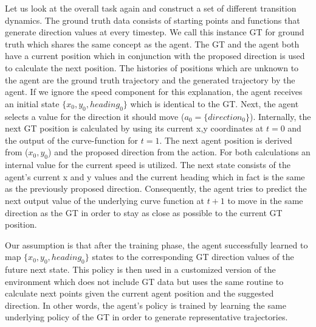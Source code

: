 Let us look at the overall task again and construct a set of different transition dynamics. The ground truth data consists of starting points and functions that generate direction values at every timestep. We call this instance GT for ground truth which shares the same concept as the agent. The GT and the agent both have a current position which in conjunction with the proposed direction is used to calculate the next position. The histories of positions which are unknown to the agent are the ground truth trajectory and the generated trajectory by the agent. If we ignore the speed component for this explanation, the agent receives an initial state $\{x_0,y_0,heading_0\}$ which is identical to the GT. Next, the agent selects a value for the direction it should move ($a_0=\{direction_0\}$). Internally, the next GT position is calculated by using its current x,y coordinates at $t=0$ and the output of the curve-function for $t=1$. The next agent position is derived from ($x_0, y_0$) and the proposed direction from the action. For both calculations an internal value for the current speed is utilized. The next state consists of the agent's current x and y values and the current heading which in fact is the same as the previously proposed direction. Consequently, the agent tries to predict the next output value of the underlying curve function at $t+1$ to move in the same direction as the GT in order to stay as close as possible to the current GT position.
\par
Our assumption is that after the training phase, the agent successfully learned to map $\{x_0,y_0,heading_0\}$ states to the corresponding GT direction values of the future next state. This policy is then used in a customized version of the environment which does not include GT data but uses the same routine to calculate next points given the current agent position and the suggested direction. In other words, the agent's policy is trained by learning the same underlying policy of the GT in order to generate representative trajectories.
\par

